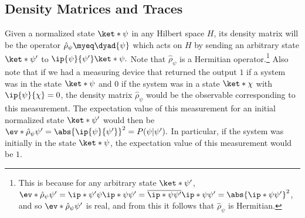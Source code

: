 \documentclass[12pt]{report}
\begin{document}
    \subsection{Density Matrices and Traces}
    Given a normalized state $\ket*{\psi}$ in any Hilbert space $H$,  
    its density matrix will be the operator $\hat{\rho}_\psi\myeq\dyad{\psi}$ %
%
    which  %
%
    acts on $H$ by sending an arbitrary state $\ket*{\psi'}$ to $\ip{\psi}{\psi'}\ket*{\psi}.$  Note that $\hat{\rho}_\psi$ is a Hermitian operator.\footnote{This is because for any arbitrary state $\ket*{\psi'}$, $\ev*{\hat{\rho}_\psi}{{\psi'}} = \ip*{\psi'}{\psi} \ip*{\psi}{\psi'}=\overline{\ip*{\psi}{\psi'}}\ip*{\psi}{\psi'}=\abs{\ip*{\psi}{\psi'}}^2$, and so $\ev*{\hat{\rho}_\psi}{{\psi'}}$ is real, and from this it follows that $\hat{\rho}_\psi$ is Hermitian. } Also note that if we had a measuring device that returned the output $1$ if a system was in the state $\ket*{\psi}$ and $0$ if the system was in a state $\ket*{\chi}$ with $\ip{\psi}{\chi}=0$, the density matrix $\hat{\rho}_\psi$ would be the observable corresponding to this measurement. The expectation value of this measurement for an initial normalized state $\ket*{\psi'}$ would then be $\ev*{\hat{\rho}_\psi}{\psi'}=\abs{\ip{\psi}{\psi'}}^2=P(\psi|\psi').$ In particular, if the system was initially in the state $\ket*{\psi}$, the expectation value of this measurement would be $1$.
\end{document}

